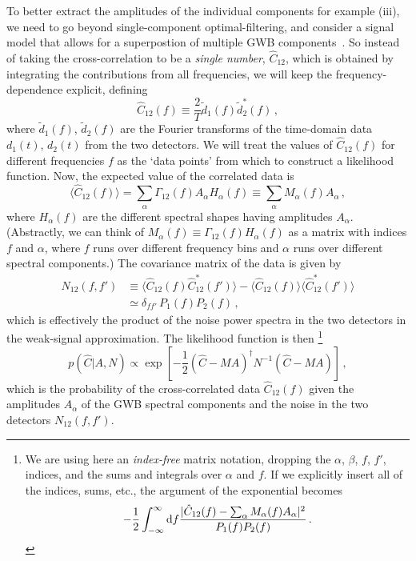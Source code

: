 \documentclass[11pt]{article}
\numberwithin{equation}{section}
\def\be{\begin{equation}}
\def\ee{\end{equation}}
\def\D{{\rm d}}
\begin{document}
To better extract the amplitudes of the individual
components for example (iii), we need to go beyond 
single-component optimal-filtering, and consider 
a signal model that allows for a superpostion 
of multiple GWB components~\cite{Parida:2016}.
So instead of taking the cross-correlation to be a 
{\em single number}, $\hat C_{12}$, which is obtained 
by integrating the contributions from all 
frequencies, we will keep the frequency-dependence
explicit, defining
%
\be
\hat C_{12}(f)\equiv\frac{2}{T} \tilde d_1(f)\tilde d^*_2(f)
\,,
\ee
%
where $\tilde d_1(f)$, $\tilde d_2(f)$ are the Fourier
transforms of the time-domain data $d_1(t)$, $d_2(t)$ 
from the two detectors.
We will treat the values of $\hat C_{12}(f)$ 
for different frequencies $f$
as the `data points' from which to construct a 
likelihood function.
Now, the expected value of the correlated data is
%
\be
\langle\hat C_{12}(f)\rangle
=\sum_\alpha \Gamma_{12}(f)A_\alpha H_\alpha(f)
\equiv \sum_\alpha M_\alpha(f) A_\alpha\,,
\ee
%
where $H_\alpha(f)$ are the different spectral
shapes having amplitudes $A_\alpha$.
(Abstractly, we can think of $M_\alpha(f) \equiv
\Gamma_{12}(f) H_\alpha(f)$ as a matrix with indices
$f$ and $\alpha$, where $f$ runs over different 
frequency bins and $\alpha$ runs over different 
spectral components.)
The covariance matrix of the data is given by
%
\be
\begin{aligned}
N_{12}(f,f') 
&\equiv \langle \hat C_{12}(f)\hat C_{12}^*(f')\rangle -
\langle \hat C_{12}(f)\rangle \langle \hat C_{12}^*(f')\rangle
\\
&\simeq \delta_{ff'}\,P_1(f) P_2(f)\,,
\end{aligned}
\ee
%
which is effectively the product of the noise power spectra
in the two detectors in the weak-signal approximation.
The likelihood function is then%
\footnote{We are using here an {\em index-free} matrix notation, 
dropping the $\alpha$, $\beta$, 
$f$, $f'$, indices, and the sums and integrals 
over $\alpha$ and $f$.
If we explicitly insert all of the indices, 
sums, etc., the argument of the exponential becomes
$$
-\frac{1}{2}\int_{-\infty}^\infty \D f
\frac{|\hat C_{12}(f)-\sum_\alpha M_\alpha(f)A_\alpha|^2}
{P_1(f)P_2(f)}\,.
$$}
%
\be
p(\hat C|A,N)\propto\exp\left[-\frac{1}{2}
(\hat C-MA)^\dagger N^{-1}(\hat C-MA)\right]\,,
\ee
%
which is the probability of the cross-correlated data
$\hat C_{12}(f)$ 
given the amplitudes $A_\alpha$ of the GWB 
spectral components 
and the noise in the two detectors $N_{12}(f,f')$.
\end{document}
